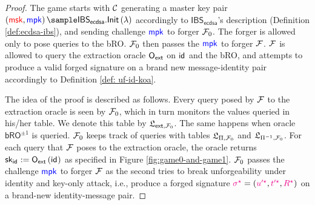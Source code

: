\documentclass[version=submission, floatrow]{iacrcc}
\begin{document}
\begin{proof}
    The game starts with $\mathcal{C}$ generating a master key pair $\left(\msk, \mpk\right) \sample \mathsf{IBS}_{\mathsf{ecdsa}}.\mathsf{Init}\left(\lambda\right)$ accordingly to $\mathsf{IBS}_{\mathsf{ecdsa}}$'s description (Definition \ref{def:ecdsa-ibs}), and sending challenge $\textcolor{blue}{\mathsf{mpk}}$ to forger $\mathcal{F}_{0}$. The forger is allowed only to pose queries to the \textsf{bRO}.
    $\mathcal{F}_{0}$ then passes the $\textcolor{blue}{\mathsf{mpk}}$ to forger $\mathcal{F}$.
    $\mathcal{F}$ is allowed to query the extraction oracle $\mathsf{O}_{\mathsf{ext}}$ on $\mathsf{id}_{}$ and the \textsf{bRO}, and attempts to produce a valid forged signature on a brand new message-identity pair accordingly to Definition \ref{def: uf-id-koa}.

    The idea of the proof is described as follows.
    Every query posed by $\mathcal{F}$ to the extraction oracle is seen by $\mathcal{F}_{0}$, which in turn monitors the values queried in his/her table.
    We denote this table by $\mathfrak{L}_{\mathsf{ext}, \mathcal{F}_{0}}$.
    The same happens when oracle $\mathsf{bRO}^{\pm1}$ is queried.
    $\mathcal{F}_{0}$ keeps track of queries with tables $\mathfrak{L}_{\Pi, \mathcal{F}_{0}}$ and $\mathfrak{L}_{\Pi^{-1}, \mathcal{F}_{0}}$.
    For each query that $\mathcal{F}$ poses to the extraction oracle, the oracle returns $\mathsf{sk}_{\mathsf{id}_{}} := \mathsf{O}_{\mathsf{ext}}\left(\mathsf{id}_{}\right)$ as specified in Figure \ref{fig:game0-and-game1}.
    $\mathcal{F}_{0}$ passes the challenge $\textcolor{blue}{\mathsf{mpk}}$ to forger $\mathcal{F}$ as the second tries to break unforgeability under identity and key-only attack, i.e., produce a forged signature $\textcolor{magenta}{\sigma^{\star}} = \left(\textcolor{magenta}{u'^{\star}}, \textcolor{magenta}{t'^{\star}}, \textcolor{magenta}{R^{\star}}\right)$ on a brand-new identity-message pair.


\end{proof}
\end{document}
